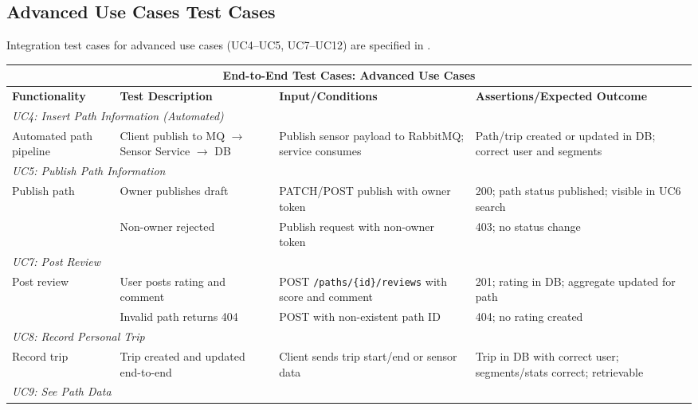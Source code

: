 \subsection{Advanced Use Cases Test Cases}
\label{subsec:advanced_use_cases_test_cases}%

Integration test cases for advanced use cases (UC4--UC5, UC7--UC12) are specified in .

\begin{table}[ht]
\centering
\begin{tabular}{|p{2.4cm}|p{3.4cm}|p{3cm}|p{5.2cm}|}
\hline
\multicolumn{4}{|c|}{\textbf{End-to-End Test Cases: Advanced Use Cases}} \\ 
\hline
\textbf{Functionality} & \textbf{Test Description} & \textbf{Input/Conditions} & \textbf{Assertions/Expected Outcome} \\
\hline
\multicolumn{4}{|l|}{\textit{UC4: Insert Path Information (Automated)}} \\
\hline
Automated path pipeline
 & Client publish to MQ $\to$ Sensor Service $\to$ DB
 & Publish sensor payload to RabbitMQ; service consumes
 & Path/trip created or updated in DB; correct user and segments \\
\hline
\multicolumn{4}{|l|}{\textit{UC5: Publish Path Information}} \\
\hline
\multirow{2}{*}{Publish path}
 & Owner publishes draft
 & PATCH/POST publish with owner token
 & 200; path status published; visible in UC6 search \\ \cline{2-4}
 & Non-owner rejected
 & Publish request with non-owner token
 & 403; no status change \\
\hline
\multicolumn{4}{|l|}{\textit{UC7: Post Review}} \\
\hline
\multirow{2}{*}{Post review}
 & User posts rating and comment
 & POST \texttt{/paths/\{id\}/reviews} with score and comment
 & 201; rating in DB; aggregate updated for path \\ \cline{2-4}
 & Invalid path returns 404
 & POST with non-existent path ID
 & 404; no rating created \\
\hline
\multicolumn{4}{|l|}{\textit{UC8: Record Personal Trip}} \\
\hline
Record trip
 & Trip created and updated end-to-end
 & Client sends trip start/end or sensor data
 & Trip in DB with correct user; segments/stats correct; retrievable \\
\hline
\multicolumn{4}{|l|}{\textit{UC9: See Path Data}} \\

\end{tabular}
\end{table}
